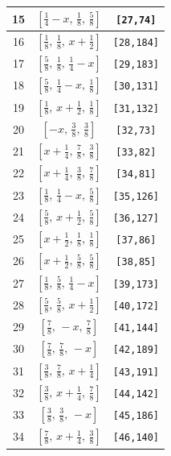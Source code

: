 \documentclass[fleqn,8pt]{jsarticle}
\begin{document}
\begin{longtable}{ccc}
15 & $\left[ \frac{1}{4} - x,\, \frac{1}{8},\, \frac{5}{8} \right]$ & {\tt [27,74]} \\ \hline
16 & $\left[ \frac{1}{8},\, \frac{1}{8},\, x + \frac{1}{2} \right]$ & {\tt [28,184]} \\ \hline
17 & $\left[ \frac{5}{8},\, \frac{1}{8},\, \frac{1}{4} - x \right]$ & {\tt [29,183]} \\ \hline
18 & $\left[ \frac{5}{8},\, \frac{1}{4} - x,\, \frac{1}{8} \right]$ & {\tt [30,131]} \\ \hline
19 & $\left[ \frac{1}{8},\, x + \frac{1}{2},\, \frac{1}{8} \right]$ & {\tt [31,132]} \\ \hline
20 & $\left[ - x,\, \frac{3}{8},\, \frac{3}{8} \right]$ & {\tt [32,73]} \\ \hline
21 & $\left[ x + \frac{1}{4},\, \frac{7}{8},\, \frac{3}{8} \right]$ & {\tt [33,82]} \\ \hline
22 & $\left[ x + \frac{1}{4},\, \frac{3}{8},\, \frac{7}{8} \right]$ & {\tt [34,81]} \\ \hline
23 & $\left[ \frac{1}{8},\, \frac{1}{4} - x,\, \frac{5}{8} \right]$ & {\tt [35,126]} \\ \hline
24 & $\left[ \frac{5}{8},\, x + \frac{1}{2},\, \frac{5}{8} \right]$ & {\tt [36,127]} \\ \hline
25 & $\left[ x + \frac{1}{2},\, \frac{1}{8},\, \frac{1}{8} \right]$ & {\tt [37,86]} \\ \hline
26 & $\left[ x + \frac{1}{2},\, \frac{5}{8},\, \frac{5}{8} \right]$ & {\tt [38,85]} \\ \hline
27 & $\left[ \frac{1}{8},\, \frac{5}{8},\, \frac{1}{4} - x \right]$ & {\tt [39,173]} \\ \hline
28 & $\left[ \frac{5}{8},\, \frac{5}{8},\, x + \frac{1}{2} \right]$ & {\tt [40,172]} \\ \hline
29 & $\left[ \frac{7}{8},\, - x,\, \frac{7}{8} \right]$ & {\tt [41,144]} \\ \hline
30 & $\left[ \frac{7}{8},\, \frac{7}{8},\, - x \right]$ & {\tt [42,189]} \\ \hline
31 & $\left[ \frac{3}{8},\, \frac{7}{8},\, x + \frac{1}{4} \right]$ & {\tt [43,191]} \\ \hline
32 & $\left[ \frac{3}{8},\, x + \frac{1}{4},\, \frac{7}{8} \right]$ & {\tt [44,142]} \\ \hline
33 & $\left[ \frac{3}{8},\, \frac{3}{8},\, - x \right]$ & {\tt [45,186]} \\ \hline
34 & $\left[ \frac{7}{8},\, x + \frac{1}{4},\, \frac{3}{8} \right]$ & {\tt [46,140]} \\ \hline

\end{longtable}
\end{document}
